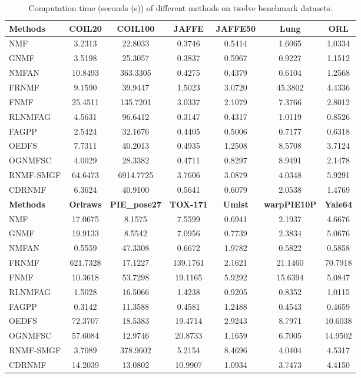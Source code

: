 \documentclass[a4paper,fleqn]{cas-sc}
\begin{document}
\begin{table}[htbp]
	\centering
	\caption{Computation time (seconds (s)) of different methods on twelve benchmark datasets.}
	{\footnotesize
	\begin{tabular}{lcccccc}
		\hline
		\textbf{Methods} & \textbf{COIL20} & \textbf{COIL100} & \textbf{JAFFE} & \textbf{JAFFE50} & \textbf{Lung} & \textbf{ORL} \\
		\hline
		NMF        & 3.2313 & 22.8033 & 0.3746 & 0.5414 & 1.6065 & 1.0334 \\
		GNMF       & 3.5198 & 25.3057 & 0.3837 & 0.5967 & 0.9227 & 1.1512 \\
		NMFAN      & 10.8493 & 363.3305 & 0.4275 & 0.4379 & 0.6104 & 1.2568 \\
		FRNMF      & 9.1590 & 39.9447 & 1.5023 & 3.0720 & 45.3802 & 4.4336 \\
		FNMF       & 25.4511 & 135.7201 & 3.0337 & 2.1079 & 7.3766 & 2.8012 \\
		RLNMFAG    & 4.5631 & 96.6412 & 0.3147 & 0.4317 & 1.0119 & 0.8526 \\
		FAGPP      & 2.5424 & 32.1676 & 0.4405 & 0.5006 & 0.7177 & 0.6318 \\
		OEDFS      & 7.7311 & 40.2013 & 0.4935 & 1.2508 & 8.5708 & 3.7124 \\
		OGNMFSC    & 4.0029 & 28.3382 & 0.4711 & 0.8297 & 8.9491 & 2.1478 \\
		RNMF-SMGF  & 64.6473 & 6914.7725 & 3.7606 & 3.0879 & 4.0348 & 5.9291 \\
		CDRNMF     & 6.3624 & 40.9100 & 0.5641 & 0.6079 & 2.0538 & 1.4769 \\
		\hline
		
		\textbf{Methods} & \textbf{Orlraws} & \textbf{PIE\_pose27} & \textbf{TOX-171} & \textbf{Umist} & \textbf{warpPIE10P} & \textbf{Yale64} \\
		\hline
		NMF        & 17.0675 & 8.1575 & 7.5599 & 0.6941 & 2.1937 & 4.6676 \\
		GNMF       & 19.9133 & 8.5542 & 7.0956 & 0.7739 & 2.3834 & 5.0676 \\
		NMFAN      & 0.5559 & 47.3308 & 0.6672 & 1.9782 & 0.5822 & 0.5858 \\
		FRNMF      & 621.7328 & 17.1227 & 139.1761 & 2.1621 & 21.1460 & 70.7918 \\
		FNMF       & 10.3618 & 53.7298 & 19.1165 & 5.9292 & 15.6394 & 5.0847 \\
		RLNMFAG    & 1.5028 & 16.5066 & 1.4238 & 0.9205 & 0.8352 & 1.0115 \\
		FAGPP      & 0.3142 & 11.3588 & 0.4581 & 1.2488 & 0.4543 & 0.4659 \\
		OEDFS      & 72.3707 & 18.5383 & 19.4714 & 2.9243 & 8.7971 & 10.6038 \\
		OGNMFSC    & 57.6084 & 12.9746 & 20.8733 & 1.1659 & 6.7005 & 14.9502 \\
		RNMF-SMGF  & 3.7089 & 378.9602 & 5.2154 & 8.4696 & 4.0404 & 4.5317 \\
		CDRNMF     & 14.2039 & 13.0802 & 10.9907 & 1.0934 & 3.7473 & 4.4150 \\
		\hline
	\end{tabular}
}
	\label{tab:comparison2}
\end{table}
\end{document}
